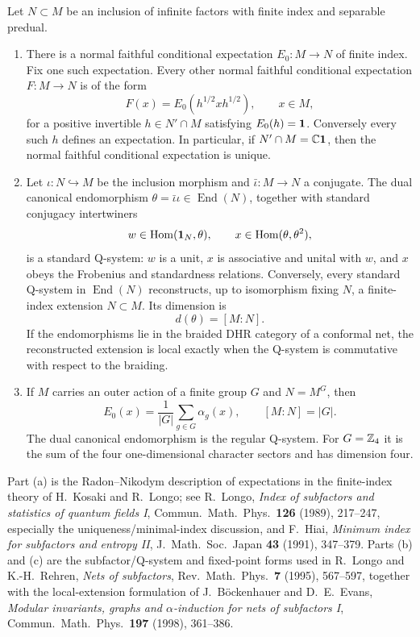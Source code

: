 \begin{theorem}
\label{thm:qsystem}
Let $N\subset M$ be an inclusion of infinite factors with finite
index and separable predual.
\begin{enumerate}[label=\textup{(\alph*)}]
\item There is a normal faithful conditional expectation
  $E_0:M\to N$ of finite index.  Fix one such expectation.  Every
  other normal faithful conditional expectation $F:M\to N$ is of
  the form
  \[
    F(x)=E_0(h^{1/2}xh^{1/2}),\qquad x\in M,
  \tag{2.4}\label{eq:rn-expectation}
  \]
  for a positive invertible $h\in N'\cap M$ satisfying
  $E_0(h)=\mathbf 1$.  Conversely every such $h$ defines an expectation.
  In particular, if $N'\cap M=\mathbb C\mathbf 1$, then the normal faithful
  conditional expectation is unique.
\item Let $\iota:N\hookrightarrow M$ be the inclusion morphism and
  $\bar\iota:M\to N$ a conjugate.  The dual canonical endomorphism
  $\theta=\bar\iota\iota\in\operatorname{End}(N)$, together with
  standard conjugacy intertwiners
  \[
    w\in\operatorname{Hom}(\mathbf 1_N,\theta),\qquad
    x\in\operatorname{Hom}(\theta,\theta^2),
  \]
  is a standard Q-system: $w$ is a unit, $x$ is associative and
  unital with $w$, and $x$ obeys the Frobenius and standardness
  relations.  Conversely, every standard Q-system in
  $\operatorname{End}(N)$ reconstructs, up to isomorphism fixing
  $N$, a finite-index extension $N\subset M$.  Its dimension is
  \[
    d(\theta)=[M:N].
  \tag{2.5}\label{eq:q-index}
  \]
  If the endomorphisms lie in the braided DHR category of a
  conformal net, the reconstructed extension is local exactly when
  the Q-system is commutative with respect to the braiding.
\item If $M$ carries an outer action of a finite group $G$ and
  $N=M^G$, then
  \[
    E_0(x)=\frac1{|G|}\sum_{g\in G}\alpha_g(x),\qquad
    [M:N]=|G|.
  \tag{2.6}\label{eq:group-average}
  \]
  The dual canonical endomorphism is the regular Q-system.  For
  $G=\mathbb Z_4$ it is the sum of the four one-dimensional character
  sectors and has dimension four.
\end{enumerate}
\end{theorem}

Part (a) is the Radon--Nikodym description of expectations in the
finite-index theory of H.~Kosaki and R.~Longo; see R.~Longo,
\emph{Index of subfactors and statistics of quantum fields I},
Commun.\ Math.\ Phys.\ \textbf{126} (1989), 217--247, especially
the uniqueness/minimal-index discussion, and
F.~Hiai, \emph{Minimum index for subfactors and entropy II},
J.\ Math.\ Soc.\ Japan \textbf{43} (1991), 347--379.  Parts (b) and
(c) are the subfactor/Q-system and fixed-point forms used in
R.~Longo and K.-H.~Rehren, \emph{Nets of subfactors},
Rev.\ Math.\ Phys.\ \textbf{7} (1995), 567--597, together with the
local-extension formulation of J.~B\"ockenhauer and D.~E.~Evans,
\emph{Modular invariants, graphs and $\alpha$-induction for nets of
subfactors I}, Commun.\ Math.\ Phys.\ \textbf{197} (1998), 361--386.

